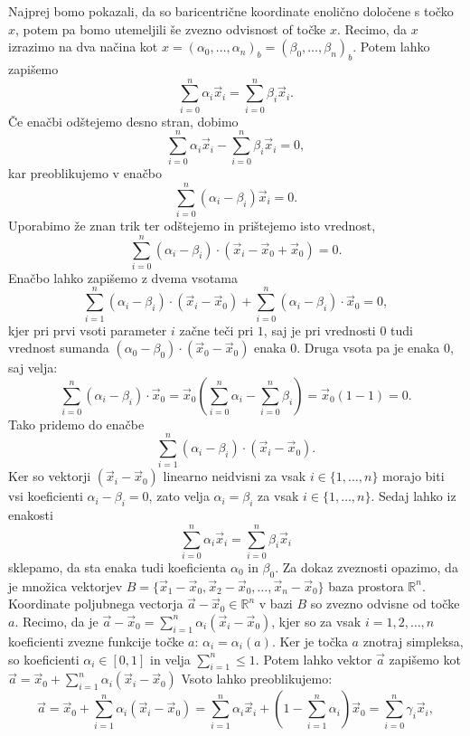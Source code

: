 \documentclass[mat1]{fmfdelo}
\newcommand{\R}{\mathbb R}
\newcommand{\0}{\underline{0}}
\begin{document}
\begin{dokaz}
Najprej bomo pokazali, da so baricentrične koordinate enolično določene s točko $x$, potem pa bomo utemeljili še zvezno odvisnost of točke $x$. Recimo, da $x$ izrazimo na dva načina kot $x = \left (\alpha_0, \dots, \alpha_n \right )_b = \left (\beta_0, \dots, \beta_n \right )_b$. Potem lahko zapišemo 
$$\sum_{i=0}^n \alpha_i \vec{x}_i = \sum_{i=0}^n \beta_i \vec{x}_i.$$
Če enačbi odštejemo desno stran, dobimo 
$$\sum_{i=0}^n \alpha_i \vec{x}_i - \sum_{i=0}^n \beta_i \vec{x}_i = 0,$$
kar preoblikujemo v enačbo
$$\sum_{i=0}^n (\alpha_i - \beta_i) \vec{x}_i  = 0.$$
Uporabimo že znan trik ter odštejemo in prištejemo isto vrednost,
$$\sum_{i=0}^n (\alpha_i  - \beta_i) \cdot (\vec{x}_i - \vec{x}_0 + \vec{x}_0) = 0.$$
Enačbo lahko zapišemo z dvema vsotama
$$\sum_{i=1}^n (\alpha_i  - \beta_i) \cdot (\vec{x}_i -\vec{x}_0) + \sum_{i=0}^n (\alpha_i  - \beta_i) \cdot \vec{x}_0= 0,$$
kjer pri prvi vsoti parameter $i$ začne teči pri $1$, saj je pri vrednosti $0$ tudi vrednost sumanda  $(\alpha_0 - \beta_0) \cdot (\vec{x}_0 -\vec{x}_0)$ enaka $0$. Druga vsota pa je enaka $0$, saj velja:
$$\sum_{i=0}^n (\alpha_i  - \beta_i) \cdot \vec{x}_0= \vec{x}_0 \left (\sum_{i=0}^n \alpha_i  - \sum_{i=0}^n \beta_i \right) = \vec{x}_0 (1 - 1)= 0.$$
Tako pridemo do enačbe 
$$\sum_{i=1}^n (\alpha_i  - \beta_i) \cdot (\vec{x}_i - \vec{x}_0).$$
Ker so vektorji $(\vec{x}_i - \vec{x}_0)$ linearno neidvisni za vsak $i \in \{ 1, \dots, n \}$ morajo biti vsi koeficienti $\alpha_i  - \beta_i = 0$, zato velja $\alpha_i  = \beta_i$ za vsak $i \in \{ 1, \dots, n \}$. Sedaj lahko iz enakosti
$$\sum_{i=0}^n \alpha_i \vec{x}_i = \sum_{i=0}^n \beta_i \vec{x}_i$$
sklepamo, da sta enaka tudi koeficienta $\alpha_0$ in $\beta_0$.
Za dokaz zveznosti opazimo, da je množica vektorjev $B = \{ \vec{x}_1 - \vec{x}_0, \vec{x}_2 - \vec{x}_0, \dots, \vec{x}_{n} - \vec{x}_0 \}$ baza prostora $\R^n$. Koordinate poljubnega vectorja $\vec{a} - \vec{x}_0 \in \R^n$ v bazi $B$ so zvezno odvisne od  točke $a$. Recimo, da je $\vec{a} - \vec{x}_0 = \sum\limits_{i=1}^n \alpha_i (\vec{x}_i - \vec{x}_0)$, kjer so za vsak $i = 1, 2, \dots, n$ koeficienti zvezne funkcije točke $a$: $\alpha_i = \alpha_i(a)$. Ker je točka $a$ znotraj simpleksa, so koeficienti $\alpha_i \in [0, 1]$ in velja $\sum\limits_{i=1}^n \leq 1$. Potem lahko vektor $\vec{a}$ zapišemo kot $\vec{a}= \vec{x}_0 + \sum\limits_{i=1}^n \alpha_i (\vec{x}_i - \vec{x}_0)$ Vsoto lahko preoblikujemo:
$$\vec{a}= \vec{x}_0 +  \sum_{i=1}^n \alpha_i (\vec{x}_i - \vec{x}_0) = \sum_{i=1}^n \alpha_i \vec{x}_i +(1 - \sum_{i=1}^n \alpha_i ) \vec{x}_0 = \sum_{i=0}^n \gamma_i \vec{x}_i,$$

\end{dokaz}
\end{document}
